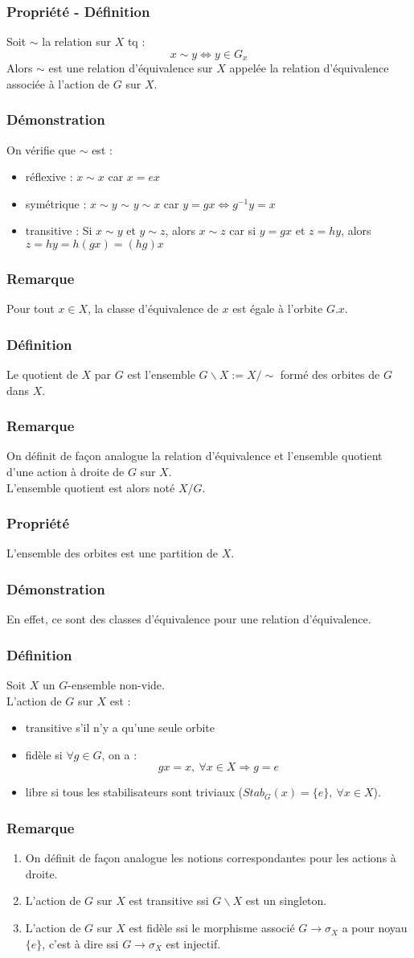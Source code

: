 \documentclass[a4paper, oneside]{report}
\newcommand{\defi}{\subsubsection{Définition}}
\newcommand{\dem}{\subsubsection{Démonstration}}
\newcommand{\propr}{\subsubsection{Propriété}}
\newcommand{\remar}{\subsubsection{Remarque}}
\begin{document}
\subsubsection{Propriété - Définition}
Soit $\sim$ la relation sur $X$ tq :
$$x\sim y \Leftrightarrow y\in G_x$$
Alors $\sim$ est une relation d'équivalence sur $X$ appelée la relation d'équivalence associée à l'action de $G$ sur $X$.

\dem
On vérifie que $\sim$ est :
\begin{itemize}
\item réflexive : $x\sim x$ car $x=ex$
\item symétrique : $x\sim y$ $\sim$ $y\sim x$ car $y=gx\Leftrightarrow g^{-1}y=x$
\item transitive : Si $x\sim y$ et $y\sim z$, alors $x\sim z$ car si $y=gx$ et $z=hy$, alors $z=hy=h(gx)=(hg)x$
\end{itemize}

\remar
Pour tout $x\in X$, la classe d'équivalence de $x$ est égale à l'orbite $G.x$.

\defi 
Le quotient de $X$ par $G$ est l'ensemble $G\backslash X := X/\sim$ formé des orbites de $G$ dans $X$.

\remar
On définit de façon analogue la relation d'équivalence et l'ensemble quotient d'une action à droite de $G$ sur $X$.\\
L'ensemble quotient est alors noté $X/G$.

\propr
L'ensemble des orbites est une partition de $X$.

\dem
En effet, ce sont des classes d'équivalence pour une relation d'équivalence.

\defi 
Soit $X$ un $G$-ensemble non-vide.\\
L'action de $G$ sur $X$ est :
\begin{itemize}
\item transitive s'il n'y a qu'une seule orbite
\item fidèle si $\forall g\in G$, on a :
$$gx=x,~\forall x\in X \Rightarrow g=e$$
\item libre si tous les stabilisateurs sont triviaux ($Stab_G(x)=\{e\},~\forall x\in X$).
\end{itemize}

\remar
\begin{enumerate}
\item On définit de façon analogue les notions correspondantes pour les actions à droite.
\item L'action de $G$ sur $X$ est transitive ssi $G\backslash X$ est un singleton.
\item L'action de $G$ sur $X$ est fidèle ssi le morphisme associé $G\rightarrow \sigma_X$ a pour noyau $\{e\}$, c'est à dire ssi $G\rightarrow \sigma_X$ est injectif.
\end{enumerate}
\end{document}
